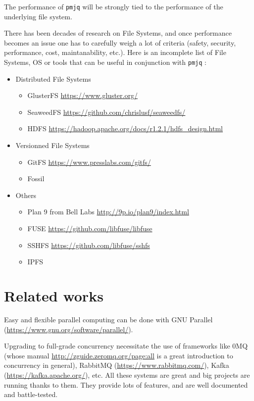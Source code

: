 \documentclass[letterpaper,twocolumn,10pt]{article}
\begin{document}
The performance of {\tt pmjq} will be strongly tied to the performance of the underlying file system.

There has been decades of research on File Systems, and once performance becomes an issue one has to carefully weigh a lot of criteria (safety, security, performance, cost, maintanability, etc.). Here is an incomplete list of File Systems, OS or tools that can be useful in conjunction with {\tt pmjq} :
\begin{itemize}
\item Distributed File Systems
  \begin{itemize}
  \item GlusterFS \url{https://www.gluster.org/}
  \item SeaweedFS \url{https://github.com/chrislusf/seaweedfs/}
  \item HDFS \url{https://hadoop.apache.org/docs/r1.2.1/hdfs_design.html}
  \end{itemize}
\item Versionned File Systems
  \begin{itemize}
  \item GitFS \url{https://www.presslabs.com/gitfs/}
  \item Fossil~\cite{fossil}
  \end{itemize}
\item Others
  \begin{itemize}
  \item Plan 9 from Bell Labs \url{http://9p.io/plan9/index.html}
  \item FUSE \url{https://github.com/libfuse/libfuse}
  \item SSHFS \url{https://github.com/libfuse/sshfs}
  \item IPFS~\cite{ipfs}
  \end{itemize}
\end{itemize}

\section{Related works}
Easy and flexible parallel computing can be done with GNU Parallel (\url{https://www.gnu.org/software/parallel/}). 

Upgrading to full-grade concurrency necessitate the use of frameworks like 0MQ (whose manual \url{http://zguide.zeromq.org/page:all} is a great introduction to concurrency in general), RabbitMQ (\url{https://www.rabbitmq.com/}), Kafka (\url{https://kafka.apache.org/}), etc. All these systems are great and big projects are running thanks to them. They provide lots of features, and are well documented and battle-tested.
\end{document}
